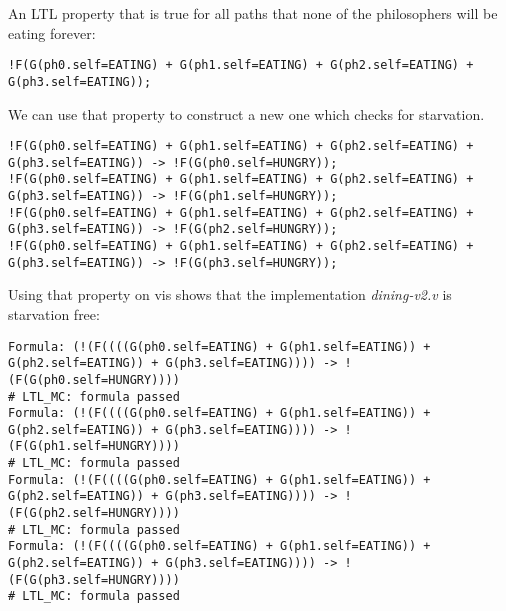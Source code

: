 \documentclass[a4paper]{article}
\begin{document}
An LTL property that is true for all paths that none of the philosophers will be eating forever:

\begin{lstlisting}
!F(G(ph0.self=EATING) + G(ph1.self=EATING) + G(ph2.self=EATING) + G(ph3.self=EATING));
\end{lstlisting}

We can use that property to construct a new one which checks for starvation.

\begin{lstlisting}
!F(G(ph0.self=EATING) + G(ph1.self=EATING) + G(ph2.self=EATING) + G(ph3.self=EATING)) -> !F(G(ph0.self=HUNGRY));
!F(G(ph0.self=EATING) + G(ph1.self=EATING) + G(ph2.self=EATING) + G(ph3.self=EATING)) -> !F(G(ph1.self=HUNGRY));
!F(G(ph0.self=EATING) + G(ph1.self=EATING) + G(ph2.self=EATING) + G(ph3.self=EATING)) -> !F(G(ph2.self=HUNGRY));
!F(G(ph0.self=EATING) + G(ph1.self=EATING) + G(ph2.self=EATING) + G(ph3.self=EATING)) -> !F(G(ph3.self=HUNGRY));
\end{lstlisting}

Using that property on vis shows that the implementation {\em dining-v2.v} is starvation free:

\begin{lstlisting}
Formula: (!(F((((G(ph0.self=EATING) + G(ph1.self=EATING)) + G(ph2.self=EATING)) + G(ph3.self=EATING)))) -> !(F(G(ph0.self=HUNGRY))))
# LTL_MC: formula passed
Formula: (!(F((((G(ph0.self=EATING) + G(ph1.self=EATING)) + G(ph2.self=EATING)) + G(ph3.self=EATING)))) -> !(F(G(ph1.self=HUNGRY))))
# LTL_MC: formula passed
Formula: (!(F((((G(ph0.self=EATING) + G(ph1.self=EATING)) + G(ph2.self=EATING)) + G(ph3.self=EATING)))) -> !(F(G(ph2.self=HUNGRY))))
# LTL_MC: formula passed
Formula: (!(F((((G(ph0.self=EATING) + G(ph1.self=EATING)) + G(ph2.self=EATING)) + G(ph3.self=EATING)))) -> !(F(G(ph3.self=HUNGRY))))
# LTL_MC: formula passed
\end{lstlisting}
\end{document}
